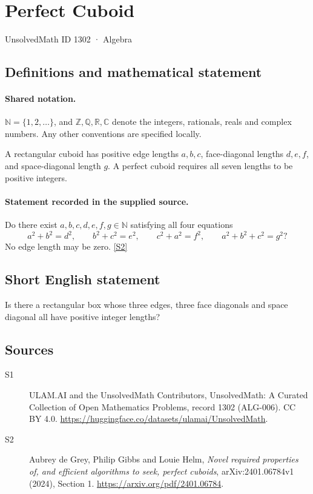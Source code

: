 \documentclass[11pt]{article}
\newcommand{\sref}[2]{\hyperlink{source:#1:#2}{[S#2]}}
\begin{document}
\setcounter{section}{1301}
\section{Perfect Cuboid}\label{1302}
{\small\sffamily UnsolvedMath ID 1302 · Algebra}
\subsection{Definitions and mathematical statement}

\paragraph{Shared notation.}$\mathbb N=\{1,2,\ldots\}$, and $\mathbb Z,\mathbb Q,\mathbb R,\mathbb C$ denote the integers, rationals, reals and complex numbers. Any other conventions are specified locally.


A rectangular cuboid has positive edge lengths $a,b,c$, face-diagonal lengths $d,e,f$, and space-diagonal length $g$. A perfect cuboid requires all seven lengths to be positive integers.
\paragraph{Statement recorded in the supplied source.}
Do there exist $a,b,c,d,e,f,g\in\mathbb N$ satisfying all four equations
\[
a^2+b^2=d^2,\qquad b^2+c^2=e^2,\qquad c^2+a^2=f^2,\qquad a^2+b^2+c^2=g^2?
\]
No edge length may be zero. \sref{1302}{2}

\subsection{Short English statement}
Is there a rectangular box whose three edges, three face diagonals and space diagonal all have positive integer lengths?
\subsection{Sources}
\begin{description}
\item[\hypertarget{source:1302:1}{S1}] ULAM.AI and the UnsolvedMath Contributors, UnsolvedMath: A Curated Collection of Open Mathematics Problems, record 1302 (ALG-006). CC BY 4.0. \url{https://huggingface.co/datasets/ulamai/UnsolvedMath}.
\item[\hypertarget{source:1302:2}{S2}] Aubrey de Grey, Philip Gibbs and Louie Helm, \emph{Novel required properties of, and efficient algorithms to seek, perfect cuboids}, arXiv:2401.06784v1 (2024), Section 1. \url{https://arxiv.org/pdf/2401.06784}.
\end{description}
\label{end:1302}
\end{document}
